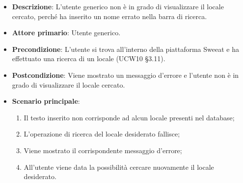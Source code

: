 \begin{itemize}
\item \textbf{Descrizione}: L'utente generico non è in grado di visualizzare il locale cercato, perché ha inserito un nome errato nella barra di ricerca.
\item \textbf{Attore primario}: Utente generico.
\item \textbf{Precondizione}: L'utente si trova all’interno della piattaforma Sweeat e ha effettuato una ricerca di un locale (UCW10 §3.11).
\item \textbf{Postcondizione}: Viene mostrato un messaggio d'errore e l'utente non è in grado di visualizzare il locale cercato.
\item \textbf{Scenario principale}:
\begin{enumerate}    
	\item Il testo inserito non corrisponde ad alcun locale presenti nel database;
	\item L'operazione di ricerca del locale desiderato fallisce;
	\item Viene mostrato il corrispondente messaggio d'errore;
	\item All'utente viene data la possibilità cercare nuovamente il locale desiderato.
\end{enumerate}
\end{itemize}